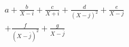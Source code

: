 \begin{multline*}
 a+\frac{b}{X-i}+\frac{c}{X+i}+\frac{d}{(X-j)^2}+\frac{e}{X-j}\\
+\frac{f}{(X-\overline{j})^2}+\frac{g}{X-\overline{j}}
\end{multline*}
